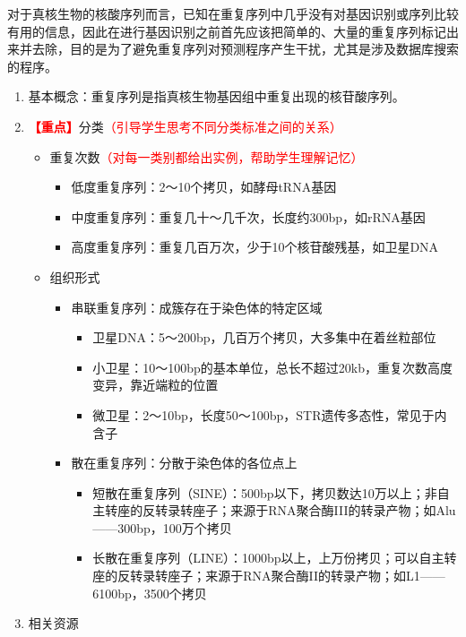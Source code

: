 \documentclass{TIJMUjiaoanLL}
\begin{document}
对于真核生物的核酸序列而言，已知在重复序列中几乎没有对基因识别或序列比较有用的信息，因此在进行基因识别之前首先应该把简单的、大量的重复序列标记出来并去除，目的是为了避免重复序列对预测程序产生干扰，尤其是涉及数据库搜索的程序。
\begin{enumerate}
  \item 基本概念：重复序列是指真核生物基因组中重复出现的核苷酸序列。
  \item \textcolor{red}{\textbf{【重点】}}分类\textcolor{red}{（引导学生思考不同分类标准之间的关系）}
    \begin{itemize}
      \item 重复次数\textcolor{red}{（对每一类别都给出实例，帮助学生理解记忆）}
	\begin{itemize}
	  \item 低度重复序列：2～10个拷贝，如酵母tRNA基因
	  \item 中度重复序列：重复几十～几千次，长度约300bp，如rRNA基因
	  \item 高度重复序列：重复几百万次，少于10个核苷酸残基，如卫星DNA
	\end{itemize}
      \item 组织形式
	\begin{itemize}
	  \item 串联重复序列：成簇存在于染色体的特定区域
	    \begin{itemize}
	      \item 卫星DNA：5～200bp，几百万个拷贝，大多集中在着丝粒部位
	      \item 小卫星：10～100bp的基本单位，总长不超过20kb，重复次数高度变异，靠近端粒的位置
	      \item 微卫星：2～10bp，长度50～100bp，STR遗传多态性，常见于内含子
	    \end{itemize}
	  \item 散在重复序列：分散于染色体的各位点上
	    \begin{itemize}
	      \item 短散在重复序列（SINE）：500bp以下，拷贝数达10万以上；非自主转座的反转录转座子；来源于RNA聚合酶III的转录产物；如Alu——300bp，100万个拷贝
	      \item 长散在重复序列（LINE）：1000bp以上，上万份拷贝；可以自主转座的反转录转座子；来源于RNA聚合酶II的转录产物；如L1——6100bp，3500个拷贝
	    \end{itemize}
	\end{itemize}
    \end{itemize}
  \item 相关资源
    \begin{itemize}

\end{itemize}
\end{enumerate}
\end{document}
